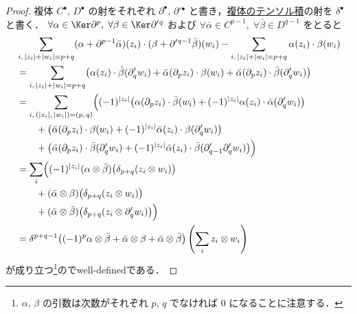 \documentclass[algtopo_main]{subfiles}
\begin{document}
\begin{proof}
    複体 $C^\bullet,\, D^\bullet$ の射をそれぞれ $\partial^\bullet,\, \partial'{}^\bullet$ と書き，\hyperref[def:tensor-complex]{複体のテンソル積}の射を $\delta^\bullet$ と書く．
    $\forall \alpha \in \Ker \partial^p,\; \forall \beta \in \Ker \partial'{}^q$ および $\forall \bar{\alpha} \in C^{p-1},\; \forall \bar{\beta} \in D^{q-1}$ をとると
    \begin{align}
        &\sum_{i,\, \abs{z_i} + \abs{w_i} = p+q} (\alpha + \partial^{p-1} \bar{\alpha})(z_i) \cdot (\beta + \partial'{}^{q-1}\bar{\beta})(w_i) - \sum_{i,\, \abs{z_i} + \abs{w_i} = p+q} \alpha(z_i) \cdot \beta(w_i) \\
        &= \sum_{i,\, \abs{z_i} + \abs{w_i} = p+q} \bigl( \alpha(z_i) \cdot \bar{\beta}(\partial'_{q}w_i) + \bar{\alpha} (\partial_{p} z_i) \cdot \beta(w_i) + \bar{\alpha} (\partial_{p} z_i) \cdot \bar{\beta}(\partial'_{q}w_i)  \bigr) \\
        &= \sum_{i,\, (\abs{z_i},\,\abs{w_i}) = (p,\, q)} \Bigl( (-1)^{\abs{z_i}}\bigl(\alpha(\partial_p z_i) \cdot \bar{\beta}(w_i) + (-1)^{\abs{z_i}} \alpha(z_i) \cdot \bar{\alpha}(\partial'_{q}w_i) \bigr) \\
        &\qquad +\bigl(\bar{\alpha} (\partial_{p} z_i) \cdot \beta(w_i) + (-1)^{\abs{z_i}} \bar{\alpha}(z_i) \cdot \beta(\partial'_q w_i) \bigr) \\
        &\qquad +\bigl(\bar{\alpha} (\partial_{p} z_i) \cdot \bar{\beta}(\partial'_{q}w_i) + (-1)^{\abs{z_i}} \bar{\alpha}(z_i) \cdot \bar{\beta} (\partial'_{q-1}\partial'_q w_i )\bigr)  \Bigr) \\
        &= \sum_{i} \Bigl( (-1)^{\abs{z_i}} (\alpha \otimes \bar{\beta})\bigl(\delta_{p+q} (z_i \otimes w_i) \bigr) \\
        &\qquad +(\bar{\alpha} \otimes \beta)\bigl(\delta_{p+q} (z_i \otimes w_i)\bigr) \\
        &\qquad +(\bar{\alpha} \otimes \bar{\beta})\bigl(\delta_{p+q} (z_i \otimes \partial'_{q}w_i) \bigr) \Bigr) \\
        &= \delta^{p+q-1}\bigl( (-1)^p \alpha \otimes \bar{\beta} + \bar{\alpha} \otimes \beta + \bar{\alpha} \otimes \bar{\beta} \bigr) \left( \sum_{i} z_i \otimes w_i \right)
    \end{align}
    が成り立つ\footnote{$\alpha,\, \beta$ の引数は次数がそれぞれ $p,\, q$ でなければ $0$ になることに注意する．}のでwell-definedである．
\end{proof}
\end{document}
